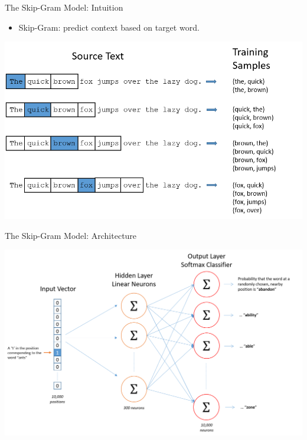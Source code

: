 \documentclass[professionalfonts, xcolor={usenames,svgnames,x11names,table}]{beamer}
\begin{document}
\begin{frame}{The Skip-Gram Model: Intuition}

	\begin{itemize}
	\item Skip-Gram: predict \alert{context} based on \alert{target} word.
	\end{itemize}

\begin{center}
        \includegraphics[width=1\linewidth]{./img/skip_gram_training}
\end{center}
\end{frame}

\begin{frame}{The Skip-Gram Model: Architecture}

\begin{center}
        \includegraphics[width=1\linewidth]{./img/skip_gram1}
\end{center}

\end{frame}
\end{document}
